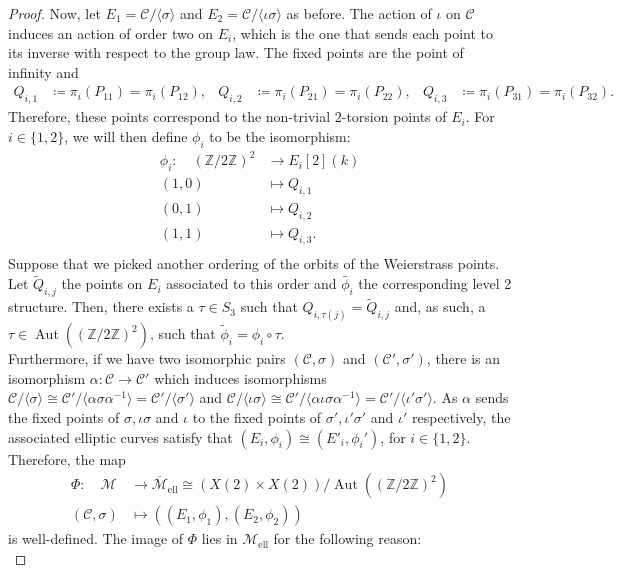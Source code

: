 \documentclass[10pt,a4paper]{amsart}
\DeclareMathOperator{\Aut}{Aut}
\newcommand{\calC}{\mathcal{C}}
\newcommand{\calM}{\mathcal{M}}
\newcommand{\mell}{\mathcal{M}_{\text{ell}}}
\newcommand{\mellc}{\overline{\mathcal{M}}_{\text{ell}}}
\begin{document}
\begin{proof}
Now, let $E_1=\calC/\langle\sigma\rangle$ and $E_2=\calC/\langle\iota\sigma\rangle$ as before. The action of $\iota$ on $\calC$ induces an action of order two on $E_i$, which  is the one that sends each point to its inverse with respect to the group law. The fixed points are the point of infinity and
\begin{align*}
Q_{i,1}&\coloneqq\pi_i(P_{11})=\pi_i(P_{12}), & Q_{i,2}&\coloneqq\pi_i(P_{21})=\pi_i(P_{22}), &
Q_{i,3}&\coloneqq\pi_i(P_{31})=\pi_i(P_{32}).
\end{align*}
Therefore, these points correspond to the non-trivial $2$-torsion points of $E_i$. For $i\in\{1,2\}$, we will then define $\phi_i$ to be the isomorphism:
\begin{align*}
\phi_i\colon\quad(\mathbb{Z}/2\mathbb{Z})^2&\longrightarrow E_i[2](k)\\
(1,0)&\longmapsto Q_{i,1}\\
(0,1)&\longmapsto Q_{i,2}\\
(1,1)&\longmapsto Q_{i,3}.\\
\end{align*}
Suppose that we picked another ordering of the orbits of the Weierstrass points. Let $\tilde{Q}_{i,j}$ the points on $E_i$ associated to this order and $\tilde{\phi_i}$ the corresponding level 2 structure. Then, there exists a $\tau\in S_3$ such that $Q_{i,\tau(j)}=\tilde{Q}_{i,j}$ and, as such, a $\tau\in \Aut((\mathbb{Z}/2\mathbb{Z})^2)$, such that $\tilde{\phi}_i=\phi_i\circ\tau$.\\

Furthermore, if we have two isomorphic pairs $(\calC,\sigma)$ and $(\calC',\sigma')$, there is an isomorphism $\alpha:\calC\rightarrow\calC'$ which induces isomorphisms $\calC/\langle\sigma\rangle\cong\calC'/\langle\alpha\sigma\alpha^{-1}\rangle=\calC'/\langle\sigma'\rangle$ and $\calC/\langle\iota\sigma\rangle\cong\calC'/\langle\alpha\iota\sigma\alpha^{-1}\rangle=\calC'/\langle\iota'\sigma'\rangle$. As $\alpha$ sends the fixed points of $\sigma, \iota\sigma$ and $\iota$ to the fixed points of $\sigma', \iota'\sigma'$ and $\iota'$ respectively, the associated elliptic curves satisfy that $(E_i,\phi_i)\cong(E'_i,\phi_i')$, for $i\in\{1,2\}$.\\

Therefore, the map
\begin{align*}
\Phi\colon\quad\calM&\longrightarrow\mellc\cong (X(2)\times X(2))/\Aut((\mathbb{Z}/2\mathbb{Z})^2)\\
(\calC,\sigma)&\longmapsto((E_1,\phi_1),(E_2,\phi_2))
\end{align*}
is well-defined. The image of $\Phi$ lies in $\mell$ for the following reason:\\


\end{proof}
\end{document}
